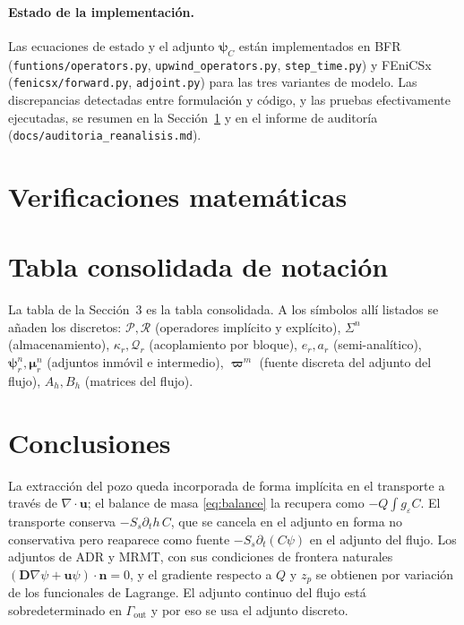 \documentclass[11pt]{article}
\numberwithin{equation}{section}
\theoremstyle{remark}
\newcommand{\bu}{\mathbf{u}}
\newcommand{\bD}{\mathbf{D}}
\newcommand{\bn}{\mathbf{n}}
\newcommand{\geps}{g_\varepsilon}
\newcommand{\Gout}{\Gamma_{\mathrm{out}}}
\begin{document}
\paragraph{Estado de la implementaci\'on.} Las ecuaciones de estado y el adjunto $\boldsymbol\psi_C$ est\'an implementados en BFR (\texttt{funtions/operators.py}, \texttt{upwind\_operators.py}, \texttt{step\_time.py}) y FEniCSx (\texttt{fenicsx/forward.py},
\texttt{adjoint.py}) para las tres variantes de modelo. Las discrepancias detectadas entre formulaci\'on y c\'odigo, y las pruebas efectivamente ejecutadas, se resumen en la Secci\'on~\ref{sec:verif} y en el informe de auditor\'ia (\texttt{docs/auditoria\_reanalisis.md}).

\section{Verificaciones matem\'aticas}
\label{sec:verif}



\section{Tabla consolidada de notaci\'on}

La tabla de la Secci\'on~3 es la tabla consolidada. A los s\'imbolos all\'i listados se a\~naden los discretos: $\mathcal{P},\mathcal{R}$ (operadores impl\'icito y expl\'icito), $\Sigma^n$ (almacenamiento),
$\kappa_r,\mathcal{Q}_r$ (acoplamiento por bloque), $e_r,a_r$ (semi-anal\'itico), $\boldsymbol\psi_r^n,\boldsymbol\mu_r^n$ (adjuntos inm\'ovil e intermedio), $\boldsymbol\varpi^m$ (fuente discreta del adjunto del flujo), $A_h,B_h$ (matrices del flujo).

\section{Conclusiones}

La extracci\'on del pozo queda incorporada de forma impl\'icita en el transporte a trav\'es de $\nabla\!\cdot\bu$; el balance de masa \eqref{eq:balance} la recupera como $-Q\int\geps C$. El transporte conserva
$-S_s\partial_th\,C$, que se cancela en el adjunto en forma no conservativa pero reaparece como fuente $-S_s\partial_t(C\psi)$ en el adjunto del flujo. Los adjuntos de ADR y MRMT, con sus condiciones de frontera naturales
$(\bD\nabla\psi+\bu\psi)\cdot\bn=0$, y el gradiente respecto a $Q$ y $z_p$ se obtienen por variaci\'on de los funcionales de Lagrange. El adjunto continuo del flujo est\'a sobredeterminado en $\Gout$ y por eso se usa el adjunto discreto.
\end{document}
